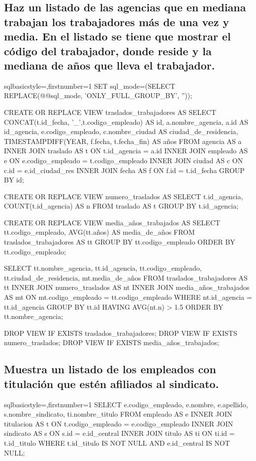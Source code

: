 	\subsection{Haz un listado de las agencias que en mediana trabajan los trabajadores más de una vez y media. En el listado se tiene que mostrar el código del trabajador, donde reside y la mediana de años que lleva el trabajador.}
		\begin{sourcecodep}[]{sql}{basicstyle={\fontsize{9}{9}\selectfont\ttfamily},firstnumber=1}{}
			SET sql_mode=(SELECT REPLACE(@@sql_mode, 'ONLY_FULL_GROUP_BY', ''));
			
			CREATE OR REPLACE VIEW traslados_trabajadores AS
				SELECT CONCAT(t.id_fecha, '_',t.codigo_empleado) AS id, a.nombre_agencia, a.id AS id_agencia, e.codigo_empleado, c.nombre_ciudad AS ciudad_de_residencia, TIMESTAMPDIFF(YEAR, f.fecha, t.fecha_fin) AS años 
				FROM agencia AS a
				INNER JOIN traslado AS t ON t.id_agencia = a.id
				INNER JOIN empleado AS e ON e.codigo_empleado = t.codigo_empleado
				INNER JOIN ciudad AS c ON c.id = e.id_ciudad_res
				INNER JOIN fecha AS f ON f.id = t.id_fecha
				GROUP BY id;
			
			CREATE OR REPLACE VIEW numero_traslados AS
				SELECT t.id_agencia, COUNT(t.id_agencia) AS n FROM traslado AS t
					GROUP BY t.id_agencia;
			
			CREATE OR REPLACE VIEW media_años_trabajados AS
				SELECT tt.codigo_empleado, AVG(tt.años) AS media_de_años FROM traslados_trabajadores AS tt
					GROUP BY tt.codigo_empleado
					ORDER BY tt.codigo_empleado;
			
			SELECT tt.nombre_agencia, tt.id_agencia, tt.codigo_empleado, tt.ciudad_de_residencia, mt.media_de_años FROM traslados_trabajadores AS tt
				INNER JOIN numero_traslados AS nt
				INNER JOIN media_años_trabajados AS mt ON mt.codigo_empleado = tt.codigo_empleado
				WHERE nt.id_agencia = tt.id_agencia
				GROUP BY tt.id
				HAVING AVG(nt.n) > 1.5
				ORDER BY tt.nombre_agencia;
			
			DROP VIEW IF EXISTS traslados_trabajadores;
			DROP VIEW IF EXISTS numero_traslados;
			DROP VIEW IF EXISTS media_años_trabajados;\end{sourcecodep}
	\subsection{Muestra un listado de los empleados con titulación que estén afiliados al sindicato.}
		\begin{sourcecodep}[]{sql}{basicstyle={\fontsize{10}{10}\selectfont\ttfamily},firstnumber=1}{}
			SELECT e.codigo_empleado, e.nombre, e.apellido, s.nombre_sindicato, ti.nombre_titulo FROM empleado AS e
				INNER JOIN titulacion AS t ON t.codigo_empleado = e.codigo_empleado
				INNER JOIN sindicato AS s ON s.id = e.id_central
				INNER JOIN titulo AS ti ON ti.id = t.id_titulo
				WHERE t.id_titulo IS NOT NULL
				AND e.id_central IS NOT NULL;\end{sourcecodep}
